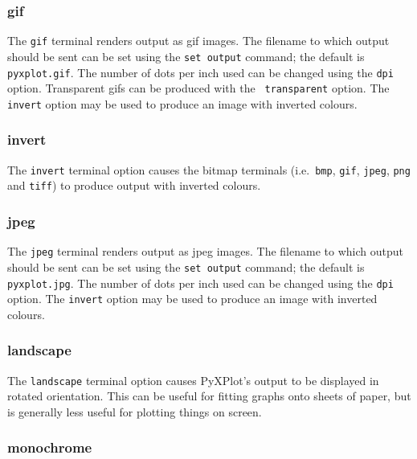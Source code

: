 \subsubsection{gif}

The {\tt gif} terminal renders output as gif images. The filename to which
output should be sent can be set using the {\tt set output} command; the
default is {\tt pyxplot.gif}. The number of dots per inch used can be changed
using the {\tt dpi} option. Transparent gifs can be produced with the {\tt
transparent} option. The {\tt invert} option may be used to produce an image
with inverted colours.


\subsubsection{invert}

The {\tt invert} terminal option causes the bitmap terminals (i.e.\ {\tt bmp},
{\tt gif}, {\tt jpeg}, {\tt png} and {\tt tiff}) to produce output with
inverted colours.


\subsubsection{jpeg}

The {\tt jpeg} terminal renders output as jpeg images. The filename to which
output should be sent can be set using the {\tt set output} command; the
default is {\tt pyxplot.jpg}.  The number of dots per inch used can be changed
using the {\tt dpi} option. The {\tt invert} option may be used to produce an
image with inverted colours.


\subsubsection{landscape}

The {\tt landscape} terminal option causes PyXPlot's output to be displayed in
rotated orientation.  This can be useful for fitting graphs onto sheets of
paper, but is generally less useful for plotting things on screen.


\subsubsection{monochrome}

